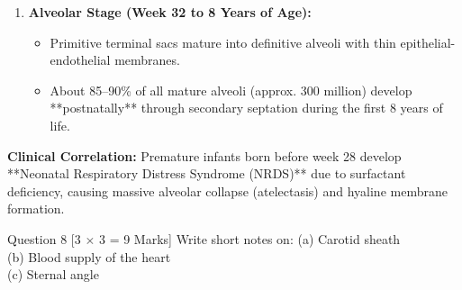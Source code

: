 \documentclass[11pt,a4paper]{article}
\begin{document}
\begin{ansbox}
\begin{enumerate}[leftmargin=*]
\begin{itemize}
\begin{itemize}
        \end{itemize}
        \item Surfactant levels increase significantly by week 34--36, preventing alveolar collapse during expiration.
    \end{itemize}
    \item \textbf{Alveolar Stage (Week 32 to 8 Years of Age):}
    \begin{itemize}
        \item Primitive terminal sacs mature into definitive alveoli with thin epithelial-endothelial membranes.
        \item About 85--90\% of all mature alveoli (approx. 300 million) develop **postnatally** through secondary septation during the first 8 years of life.
    \end{itemize}
\end{enumerate}

\textbf{Clinical Correlation:} Premature infants born before week 28 develop **Neonatal Respiratory Distress Syndrome (NRDS)** due to surfactant deficiency, causing massive alveolar collapse (atelectasis) and hyaline membrane formation.
\end{ansbox}

\begin{qbox}{Question 8 [3 $\times$ 3 = 9 Marks]}
Write short notes on:
(a) Carotid sheath \\
(b) Blood supply of the heart \\
(c) Sternal angle
\end{qbox}
\end{document}
